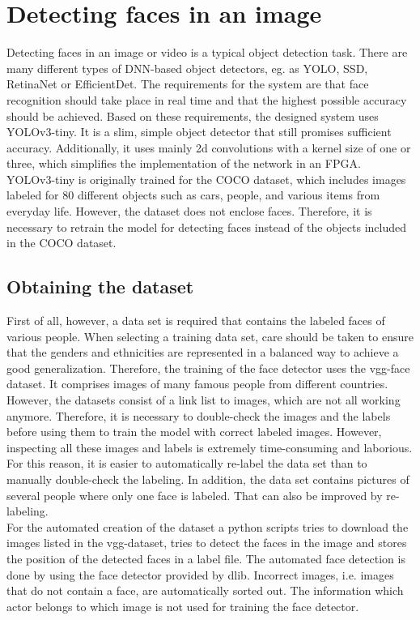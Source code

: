 \documentclass[%
a4paper,
twoside,
openany,
dvipsnames
]
{report}
\begin{document}
	\section{Detecting faces in an image}
	Detecting faces in an image or video is a typical object detection task. There are many different types of DNN-based object detectors, eg. as YOLO, SSD, RetinaNet or EfficientDet. The requirements for the system are that face recognition should take place in real time and that the highest possible accuracy should be achieved. Based on these requirements, the designed system uses YOLOv3-tiny. It is a slim, simple object detector that still promises sufficient accuracy. Additionally, it uses mainly 2d convolutions with a kernel size of one or three, which simplifies the implementation of the network in an \gls{FPGA}. \\
	YOLOv3-tiny is originally trained for the COCO dataset, which includes images labeled for 80 different objects such as cars, people, and various items from everyday life. However, the dataset does not enclose faces. Therefore, it is necessary to retrain the model for detecting faces instead of the objects included in the COCO dataset. 
	\subsection{Obtaining the dataset}
	First of all, however, a data set is required that contains the labeled faces of various people. When selecting a training data set, care should be taken to ensure that the genders and ethnicities are represented in a balanced way to achieve a good generalization. Therefore, the training of the face detector uses the vgg-face dataset. It comprises images of many famous people from different countries. However, the datasets consist of a link list to images, which are not all working anymore. Therefore, it is necessary to double-check the images and the labels before using them to train the model with correct labeled images. However, inspecting all these images and labels is extremely time-consuming and laborious. For this reason, it is easier to automatically re-label the data set than to manually double-check the labeling. In addition, the data set contains pictures of several people where only one face is labeled. That can also be improved by re-labeling. \\
	For the automated creation of the dataset a python scripts tries to download the images listed in the vgg-dataset, tries to detect the faces in the image and stores the position of the detected faces in a label file. The automated face detection is done by using the face detector provided by dlib. Incorrect images, i.e. images that do not contain a face, are automatically sorted out. The information which actor belongs to which image is not used for training the face detector. \\
\end{document}
